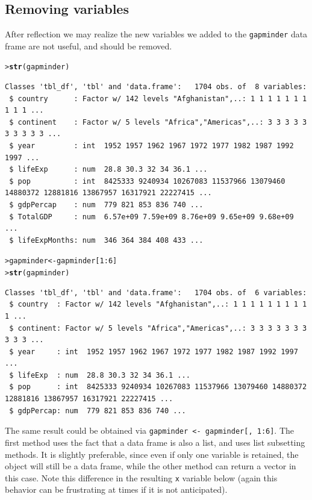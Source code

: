 \documentclass[12pt,oneside]{book}\usepackage[]{graphicx}\usepackage[]{color}
\makeatletter
\newcommand{\hlnum}[1]{\textcolor[rgb]{0.686,0.059,0.569}{#1}}%
\newcommand{\hlopt}[1]{\textcolor[rgb]{0,0,0}{#1}}%
\newcommand{\hlstd}[1]{\textcolor[rgb]{0.345,0.345,0.345}{#1}}%
\newcommand{\hlkwb}[1]{\textcolor[rgb]{0.69,0.353,0.396}{#1}}%
\newcommand{\hlkwd}[1]{\textcolor[rgb]{0.737,0.353,0.396}{\textbf{#1}}}%
\newenvironment{kframe}{%
 \def\at@end@of@kframe{}%
 \ifinner\ifhmode%
  \def\at@end@of@kframe{\end{minipage}}%
  \begin{minipage}{\columnwidth}%
 \fi\fi%
 \def\FrameCommand##1{\hskip\@totalleftmargin \hskip-\fboxsep
 \colorbox{shadecolor}{##1}\hskip-\fboxsep
     \hskip-\linewidth \hskip-\@totalleftmargin \hskip\columnwidth}%
 \MakeFramed {\advance\hsize-\width
   \@totalleftmargin\z@ \linewidth\hsize
   \@setminipage}}%
 {\par\unskip\endMakeFramed%
 \at@end@of@kframe}
\newenvironment{knitrout}{}{} %
\makeatother
\begin{document}
\subsection{Removing variables}
After reflection we may realize the new variables we added to the \verb+gapminder+ data frame are not useful, and should be removed.
\begin{knitrout}
\color{fgcolor}\begin{kframe}
\begin{alltt}
\hlstd{> }\hlkwd{str}\hlstd{(gapminder)}
\end{alltt}
\begin{verbatim}
Classes 'tbl_df', 'tbl' and 'data.frame':	1704 obs. of  8 variables:
 $ country      : Factor w/ 142 levels "Afghanistan",..: 1 1 1 1 1 1 1 1 1 1 ...
 $ continent    : Factor w/ 5 levels "Africa","Americas",..: 3 3 3 3 3 3 3 3 3 3 ...
 $ year         : int  1952 1957 1962 1967 1972 1977 1982 1987 1992 1997 ...
 $ lifeExp      : num  28.8 30.3 32 34 36.1 ...
 $ pop          : int  8425333 9240934 10267083 11537966 13079460 14880372 12881816 13867957 16317921 22227415 ...
 $ gdpPercap    : num  779 821 853 836 740 ...
 $ TotalGDP     : num  6.57e+09 7.59e+09 8.76e+09 9.65e+09 9.68e+09 ...
 $ lifeExpMonths: num  346 364 384 408 433 ...
\end{verbatim}
\begin{alltt}
\hlstd{> }\hlstd{gapminder} \hlkwb{<-} \hlstd{gapminder[}\hlnum{1}\hlopt{:}\hlnum{6}\hlstd{]}
\hlstd{> }\hlkwd{str}\hlstd{(gapminder)}
\end{alltt}
\begin{verbatim}
Classes 'tbl_df', 'tbl' and 'data.frame':	1704 obs. of  6 variables:
 $ country  : Factor w/ 142 levels "Afghanistan",..: 1 1 1 1 1 1 1 1 1 1 ...
 $ continent: Factor w/ 5 levels "Africa","Americas",..: 3 3 3 3 3 3 3 3 3 3 ...
 $ year     : int  1952 1957 1962 1967 1972 1977 1982 1987 1992 1997 ...
 $ lifeExp  : num  28.8 30.3 32 34 36.1 ...
 $ pop      : int  8425333 9240934 10267083 11537966 13079460 14880372 12881816 13867957 16317921 22227415 ...
 $ gdpPercap: num  779 821 853 836 740 ...
\end{verbatim}
\end{kframe}
\end{knitrout}
The same result could be obtained via \verb+gapminder <- gapminder[, 1:6]+. The first method uses the fact that a data frame is also a list, and uses list subsetting methods. It is slightly preferable, since even if only one variable is retained, the object will still be a data frame, while the other method can return a vector in this case. Note this difference in the resulting \verb+x+ variable below (again this behavior can be frustrating at times if it is not anticipated).
\end{document}
